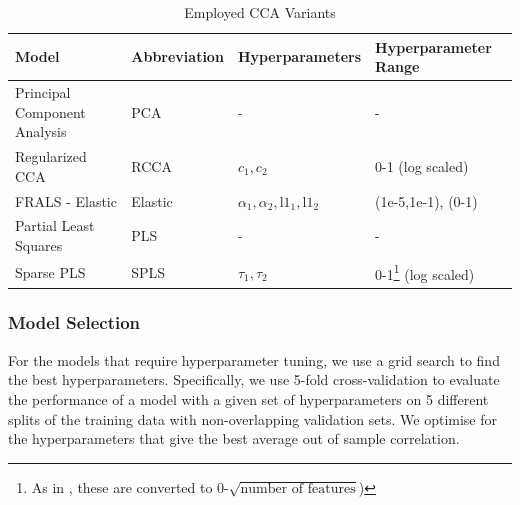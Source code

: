 \begin{table}[h]
    \centering
    \caption{Employed CCA Variants}
    \begin{tabular}{|l|l|l|l|}
        \hline
        \textbf{Model}               & \textbf{Abbreviation} & \textbf{Hyperparameters}                         & \textbf{Hyperparameter Range}                                                                                             \\
        \hline
        Principal Component Analysis & PCA                   & -                                                & -                                                                                                                         \\
        \hline
        Regularized CCA              & RCCA                  & \(c_1, c_2\)                                     & 0-1 (log scaled)                                                                                                          \\
        \hline
        FRALS - Elastic              & Elastic               & \(\alpha_1, \alpha_2, \text{l1}_1, \text{l1}_2\) & (1e-5,1e-1), (0-1)                                                                                                        \\
        \hline
        Partial Least Squares        & PLS                   & -                                                & -                                                                                                                         \\
        \hline
        Sparse PLS                   & SPLS                  & \(\tau_1, \tau_2\)                               & 0-1\footnote{As in \citet{witten2013package}, these are converted to 0-$\sqrt {\text{number of features}}$)} (log scaled) \\
        \hline
    \end{tabular}\label{table:cca-variants}
\end{table}

\subsubsection{Model Selection}

For the models that require hyperparameter tuning, we use a grid search to find the best hyperparameters.
Specifically, we use 5-fold cross-validation to evaluate the performance of a model with a given set of hyperparameters on 5 different splits of the training data with non-overlapping validation sets.
We optimise for the hyperparameters that give the best average out of sample correlation.

